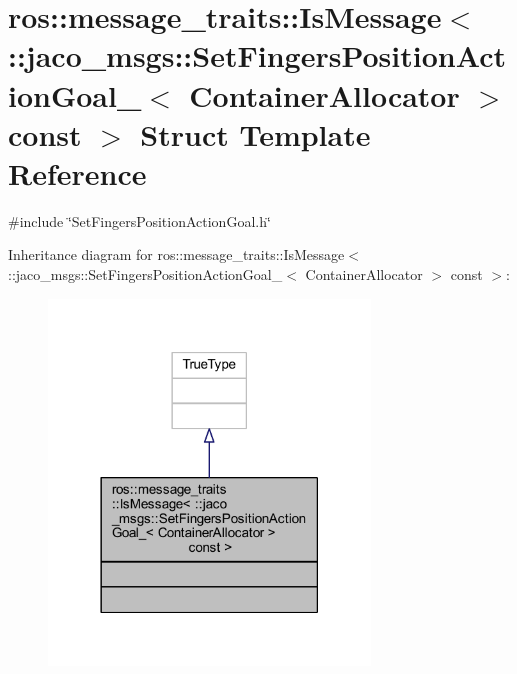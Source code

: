 \hypertarget{structros_1_1message__traits_1_1IsMessage_3_01_1_1jaco__msgs_1_1SetFingersPositionActionGoal___3cdf0887a72e87b8cff4cc9faad2fb585}{}\section{ros\+:\+:message\+\_\+traits\+:\+:Is\+Message$<$ \+:\+:jaco\+\_\+msgs\+:\+:Set\+Fingers\+Position\+Action\+Goal\+\_\+$<$ Container\+Allocator $>$ const $>$ Struct Template Reference}
\label{structros_1_1message__traits_1_1IsMessage_3_01_1_1jaco__msgs_1_1SetFingersPositionActionGoal___3cdf0887a72e87b8cff4cc9faad2fb585}


{\ttfamily \#include \char`\"{}Set\+Fingers\+Position\+Action\+Goal.\+h\char`\"{}}



Inheritance diagram for ros\+:\+:message\+\_\+traits\+:\+:Is\+Message$<$ \+:\+:jaco\+\_\+msgs\+:\+:Set\+Fingers\+Position\+Action\+Goal\+\_\+$<$ Container\+Allocator $>$ const $>$\+:
\nopagebreak
\begin{figure}[H]
\begin{center}
\leavevmode
\includegraphics[width=242pt]{df/d62/structros_1_1message__traits_1_1IsMessage_3_01_1_1jaco__msgs_1_1SetFingersPositionActionGoal___30ee58a70ec068979f5569e95ce9754a8}
\end{center}
\end{figure}


